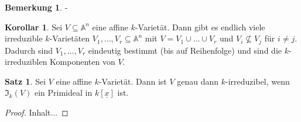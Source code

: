 \documentclass[
twoside=semi,
fontsize=12,
DIV=12, 
cleardoublepage=current,
leqno,
headings=optiontoheadandtoc, 
toc=idx
]{scrbook}
\newcommand{\A}{\mathbb{A}}
\newcommand{\x}{\underline{x}}
\newcommand{\I}{\mathfrak{I}}
\theoremstyle{definition}
\newtheorem{bemerkung}[definition]{Bemerkung}
\newtheorem{satz}[definition]{Satz}
\newtheorem{korollar}[definition]{Korollar}
\begin{document}
	\begin{bemerkung}
		-
	\end{bemerkung}

	\begin{korollar}\label{1.3.12}\hfill\newline
		Sei $V \subseteq \A^n$ eine affine $k$-Variet\"at. Dann gibt es endlich viele irreduzible $k$-Variet\"aten $V_1, \dots, V_r \subseteq \A^n$ mit $V = V_1 \cup \dots \cup V_r$ und $V_i \nsubseteq V_j$ f\"ur $i\neq j$. Dadurch sind $V_1, \dots, V_r$ eindeutig bestimmt (bis auf Reihenfolge) und sind die $k$-irreduziblen Komponenten von $V$.
	\end{korollar}

	\begin{satz}\label{1.3.13}\hfill\newline
		Sei $V$ eine affine $k$-Variet\"at. Dann ist $V$ genau dann $k$-irreduzibel, wenn $\I_k(V) $ ein Primideal in $k[\x]$ ist. 
	\end{satz}

	\begin{proof}
		Inhalt...
	\end{proof}
\end{document}
